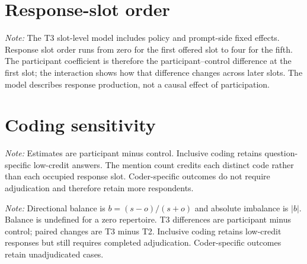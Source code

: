 \documentclass{article}
\begin{document}
\section{Response-slot order}

\begin{table}[H]
\centering
\caption{Linear probability model for whether a response slot contains a valid reason}

\begin{minipage}{0.95\textwidth}
\smallskip\footnotesize
\textit{Note:} The T3 slot-level model includes policy and prompt-side fixed effects. Response
slot order runs from zero for the first offered slot to four for the fifth. The participant
coefficient is therefore the participant--control difference at the first slot; the interaction
shows how that difference changes across later slots. The model describes response production,
not a causal effect of participation.
\end{minipage}
\end{table}

\section{Coding sensitivity}

\begin{table}[H]
\centering
\caption{Sensitivity of the total-repertoire T3 comparison to coding choices}

\begin{minipage}{0.95\textwidth}
\smallskip\footnotesize
\textit{Note:} Estimates are participant minus control. Inclusive coding retains
question-specific low-credit answers. The mention count credits each distinct code rather than
each occupied response slot. Coder-specific outcomes do not require adjudication and therefore
retain more respondents.
\end{minipage}
\end{table}

\begin{table}[H]
\centering
\small
\caption{Sensitivity of directional balance to coding choices}
\resizebox{\textwidth}{!}{%

}
\begin{minipage}{0.95\textwidth}
\smallskip\footnotesize
\textit{Note:} Directional balance is $b=(s-o)/(s+o)$ and absolute imbalance is $|b|$.
Balance is undefined for a zero repertoire. T3 differences are participant minus control;
paired changes are T3 minus T2. Inclusive coding retains low-credit responses but still
requires completed adjudication. Coder-specific outcomes retain unadjudicated cases.
\end{minipage}
\end{table}
\end{document}

